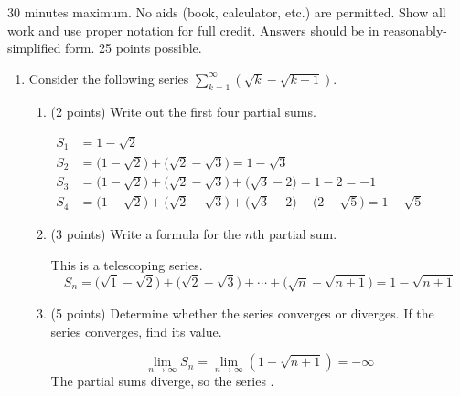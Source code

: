 \documentclass[12pt]{article}
\newcommand{\ds}{\displaystyle}
\begin{document}
30 minutes maximum.  No aids (book, calculator, etc.) are permitted.
Show all work and use proper notation for full credit.  Answers should
be in reasonably-simplified form.  25 points possible.

\begin{enumerate}

\item Consider the following series $\ds \sum_{k=1}^{\infty} \left( \sqrt{k} - \sqrt{k+1} \right)$.
  \begin{enumerate}
  \item (2 points) Write out the first four partial sums.
    \begin{solution}
      $\begin{aligned}
        S_1 &= 1 - \sqrt2 \\
        S_2 &= \big(1 - \sqrt2\big) + \big(\sqrt2 - \sqrt3\big) = 1 - \sqrt3 \\
        S_3 &= \big(1 - \sqrt2\big) + \big(\sqrt2 - \sqrt3\big) + \big(\sqrt3 - 2\big) = 1 - 2 = -1 \\
        S_4 &= \big(1 - \sqrt2\big) + \big(\sqrt2 - \sqrt3\big) + \big(\sqrt3 - 2\big) + \big(2 - \sqrt5\big) = 1 - \sqrt5
      \end{aligned}$
    \end{solution}
    \vfill
    
  \item (3 points) Write a formula for the $n$th partial sum.
    \begin{solution}
      This is a telescoping series.
      \[
        S_n = \big(\sqrt1 - \sqrt2\big) + \big(\sqrt2 - \sqrt3\big) + \cdots + \big(\sqrt{n} - \sqrt{n+1}\big)
        = \boxed{1 - \sqrt{n+1}}
      \]
    \end{solution}
    \vfill
    
  \item (5 points) Determine whether the series converges or diverges. If the
    series converges, find its value.
    \begin{solution}
      \[
        \lim_{n\to\infty} S_n = \lim_{n\to\infty} \left( 1 - \sqrt{n+1} \right) = -\infty
      \]
      The partial sums diverge, so the series .
    \end{solution}
    \vfill
  \end{enumerate}


\end{enumerate}
\end{document}
